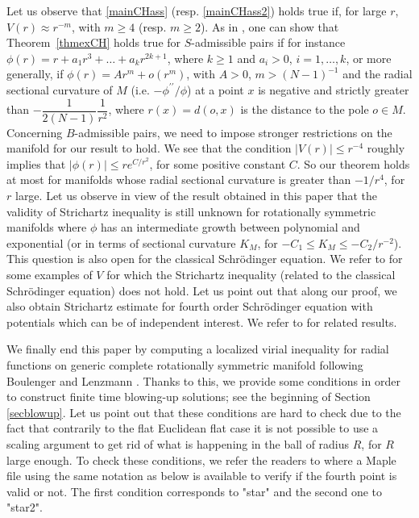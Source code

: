 \documentclass[10pt,leqno]{amsart}
\numberwithin{equation}{section}
\begin{document}
Let us observe that \eqref{mainCHass} (resp. \eqref{mainCHass2}) holds true if, for large $r$, $V(r)\approx r^{-m}$, with $m\geq 4$ (resp. $m\geq 2$).
As in \cite{BaDyweight}, one can show that Theorem~\ref{thmexCH} holds true for $S$-admissible pairs if for instance $\phi (r)=r+a_1 r^3 +\ldots +a_k r^{2k +1}$, where $k\geq 1$ and $a_i>0$, $i=1,\ldots ,k$, or more generally, if $\phi (r)= Ar^m +o(r^m)$, with $A>0$, $m> (N-1)^{-1}$ and the radial sectional curvature of $M$ (i.e. $-\phi^{\prime \prime}/\phi$) at a point $x$ is negative and strictly greater than $- \dfrac{1}{2(N-1) }\dfrac{1}{r^2}$, where $r(x)=d(o,x)$ is the distance to the pole $o\in M$. Concerning $B$-admissible pairs, we need to impose stronger restrictions on the manifold for our result to hold. We see that the condition $|V(r)|\leq r^{-4}$ roughly implies that $|\phi(r)| \leq r e^{C/r^2}$, for some positive constant $C$. So our theorem holds at most for manifolds whose radial sectional curvature is greater than $-1/r^4$, for $r$ large. 
Let us observe in view of the result obtained in this paper that the validity of Strichartz inequality is still unknown for rotationally symmetric manifolds where $\phi$ has an intermediate growth between polynomial and exponential (or in terms of sectional curvature $K_M$, for $-C_1\leq K_M \leq -C_2 /r^{-2}$). This question is also open for the classical Schr\" odinger equation. We refer to \cite{MR2211154,MR2296623} for some examples of $V$ for which the Strichartz inequality (related to the classical Schr\" odinger equation) does not hold. Let us point out that along our proof, we also obtain Strichartz estimate for fourth order Schr\" odinger equation with potentials which can be of independent interest. We refer to \cite{MR4069234} for related results.  








We finally end this paper by computing a localized virial inequality for radial functions on generic complete rotationally symmetric manifold following Boulenger and Lenzmann \cite{bou-lenz}. Thanks to this, we provide some conditions in order to construct finite time blowing-up solutions; see the beginning of Section \ref{secblowup}. Let us point out that these conditions are hard to check due to the fact that contrarily to the flat Euclidean flat case it is not possible to use a scaling argument to get rid of what is happening in the ball of radius $R$, for $R$ large enough. To check these conditions, we refer the readers to \cite{maple} where a Maple file using the same notation as below is available to verify if the fourth point is valid or not. The first condition corresponds to "star" and the second one to "star2".
\end{document}
